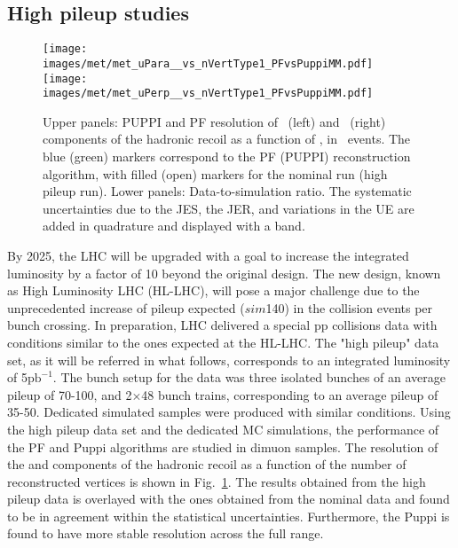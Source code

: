\subsection{High pileup studies}
\begin{figure}[!htp]
  \centering
   \texttt{[image: images/met/met\_uPara\_\_vs\_nVertType1\_PFvsPuppiMM.pdf]}
   \texttt{[image: images/met/met\_uPerp\_\_vs\_nVertType1\_PFvsPuppiMM.pdf]}
   \caption{Upper panels: PUPPI and PF \ptmiss resolution of \upar\ (left) and \uperp\ (right) components of the hadronic recoil as a function of \nvtx, in \Zmm\ events. 
The blue (green) markers correspond to the PF (PUPPI) \ptmiss reconstruction algorithm, with filled (open) markers for the nominal run (high pileup run).  
Lower panels: Data-to-simulation ratio. The systematic uncertainties due to the JES, the JER, and variations in the UE are added in quadrature and displayed with a band.}
   \label{fig:Res_vs_PileUpVeryHighPU}
\end{figure}                                                                                                                                                                                   
By 2025, the LHC will be upgraded with a goal to increase the integrated luminosity by a factor of 10 beyond the original design. 
The new design, known as High Luminosity LHC (HL-LHC), will pose a major challenge due to the unprecedented increase of pileup expected ($sim$140) in the collision events per bunch crossing. 
In preparation, LHC delivered a special pp collisions data with conditions similar to the ones expected at the HL-LHC. 
The "high pileup" data set, as it will be referred in what follows, corresponds to an integrated luminosity of 5$\mathrm{pb}^{-1}$. 
The bunch setup for the data was three isolated bunches of an average pileup of 70-100, and 2$\times$48 bunch trains, corresponding to an average pileup of 35-50. 
Dedicated simulated samples were produced with similar conditions. 
Using the high pileup data set and the dedicated MC simulations, the performance of the PF \ptmiss and Puppi \ptmiss algorithms are studied in dimuon samples.
The \ptmiss resolution of the \upar and \uperp components of the hadronic recoil as a function of the number of reconstructed
vertices is shown in Fig.~\ref{fig:Res_vs_PileUpVeryHighPU}. 
The results obtained from the high pileup data is overlayed with the ones obtained from the nominal data and found to be in agreement within the statistical uncertainties. 
Furthermore, the Puppi \ptmiss is found to have more stable resolution across the full range.

\clearpage
